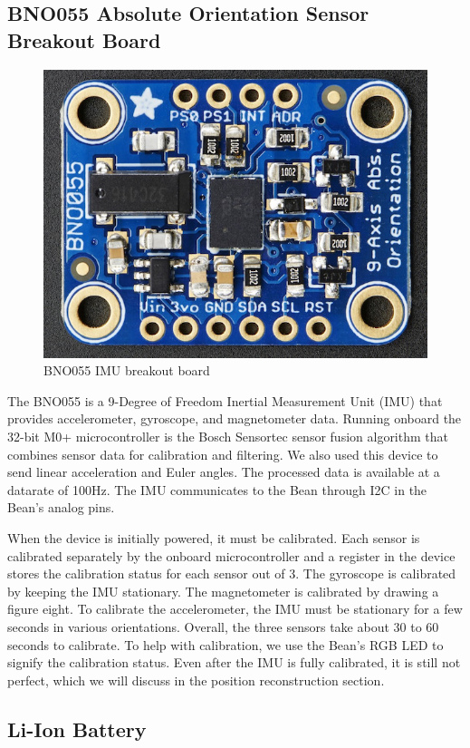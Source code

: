 \documentclass[10pt,journal]{IEEEtran}
\begin{document}
\subsection{BNO055 Absolute Orientation Sensor Breakout Board}

\begin{figure}[H]
  \centering
    \includegraphics[width=0.6\linewidth]{figures/imu}
  \caption{BNO055 IMU breakout board}
  \label{fig:imu}
\end{figure}
  The BNO055 is a 9-Degree of Freedom Inertial Measurement Unit (IMU) that provides accelerometer, gyroscope, and magnetometer data. Running onboard the 32-bit M0+ microcontroller is the Bosch Sensortec sensor fusion algorithm that combines sensor data for calibration and filtering. We also used this device to send linear acceleration and Euler angles. The processed data is available at a datarate of 100Hz. The IMU communicates to the Bean through I2C in the Bean’s analog pins.
\par When the device is initially powered, it must be calibrated. Each sensor is calibrated separately by the onboard microcontroller and a register in the device stores the calibration status for each sensor out of 3. The gyroscope is calibrated by keeping the IMU stationary. The magnetometer is calibrated by drawing a figure eight. To calibrate the accelerometer, the IMU must be stationary for a few seconds in various orientations. Overall, the three sensors take about 30 to 60 seconds to calibrate. To help with calibration, we use the Bean’s RGB LED to signify the calibration status. Even after the IMU is fully calibrated, it is still not perfect, which we will discuss in the position reconstruction section.
\subsection{Li-Ion Battery}
\end{document}
